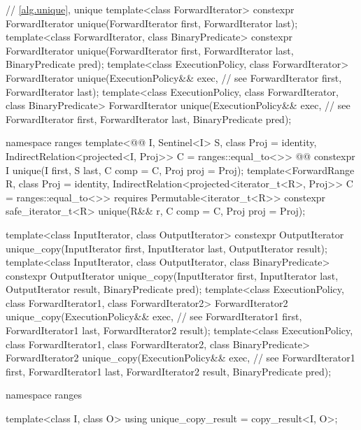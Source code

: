 \begin{codeblock}
  // \ref{alg.unique}, unique
  template<class ForwardIterator>
    constexpr ForwardIterator unique(ForwardIterator first, ForwardIterator last);
  template<class ForwardIterator, class BinaryPredicate>
    constexpr ForwardIterator unique(ForwardIterator first, ForwardIterator last,
                                     BinaryPredicate pred);
  template<class ExecutionPolicy, class ForwardIterator>
    ForwardIterator unique(ExecutionPolicy&& exec, // see 
                           ForwardIterator first, ForwardIterator last);
  template<class ExecutionPolicy, class ForwardIterator, class BinaryPredicate>
    ForwardIterator unique(ExecutionPolicy&& exec, // see 
                           ForwardIterator first, ForwardIterator last,
                           BinaryPredicate pred);
\end{codeblock}\begin{addedblock}\begin{codeblock}
  namespace ranges {
    template<@@ I, Sentinel<I> S, class Proj = identity,
        IndirectRelation<projected<I, Proj>> C = ranges::equal_to<>>
      @@
      constexpr I unique(I first, S last, C comp = C{}, Proj proj = Proj{});
    template<ForwardRange R, class Proj = identity,
        IndirectRelation<projected<iterator_t<R>, Proj>> C = ranges::equal_to<>>
      requires Permutable<iterator_t<R>>
      constexpr safe_iterator_t<R>
        unique(R&& r, C comp = C{}, Proj proj = Proj{});
  }
\end{codeblock}\end{addedblock}\begin{codeblock}
  template<class InputIterator, class OutputIterator>
    constexpr OutputIterator
      unique_copy(InputIterator first, InputIterator last,
                  OutputIterator result);
  template<class InputIterator, class OutputIterator, class BinaryPredicate>
    constexpr OutputIterator
      unique_copy(InputIterator first, InputIterator last,
                  OutputIterator result, BinaryPredicate pred);
  template<class ExecutionPolicy, class ForwardIterator1, class ForwardIterator2>
    ForwardIterator2
      unique_copy(ExecutionPolicy&& exec, // see 
                  ForwardIterator1 first, ForwardIterator1 last,
                  ForwardIterator2 result);
  template<class ExecutionPolicy, class ForwardIterator1, class ForwardIterator2,
           class BinaryPredicate>
    ForwardIterator2
      unique_copy(ExecutionPolicy&& exec, // see 
                  ForwardIterator1 first, ForwardIterator1 last,
                  ForwardIterator2 result, BinaryPredicate pred);
\end{codeblock}\begin{addedblock}\begin{codeblock}
  namespace ranges {
    template<class I, class O>
    using unique_copy_result = copy_result<I, O>;

}
\end{codeblock}
\end{addedblock}
